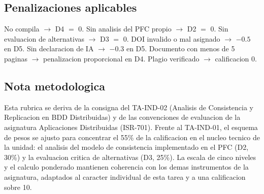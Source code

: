 \documentclass[11pt,a4paper]{article}
\begin{document}
\subsection{Penalizaciones aplicables}
No compila $\rightarrow$ D4 $=$ 0. \quad Sin analisis del PFC propio $\rightarrow$ D2 $=$ 0. \quad Sin evaluacion de alternativas $\rightarrow$ D3 $=$ 0. \quad DOI invalido o mal asignado $\rightarrow$ $-0.5$ en D5. \quad Sin declaracion de IA $\rightarrow$ $-0.3$ en D5. \quad Documento con menos de 5 paginas $\rightarrow$ penalizacion proporcional en D4. \quad Plagio verificado $\rightarrow$ calificacion 0.

\subsection{Nota metodologica}
Esta rubrica se deriva de la consigna del TA-IND-02 (Analisis de Consistencia y Replicacion en BDD Distribuidas) y de las convenciones de evaluacion de la asignatura Aplicaciones Distribuidas (ISR-701). Frente al TA-IND-01, el esquema de pesos se ajusto para concentrar el 55\% de la calificacion en el nucleo tecnico de la unidad: el analisis del modelo de consistencia implementado en el PFC (D2, 30\%) y la evaluacion critica de alternativas (D3, 25\%). La escala de cinco niveles y el calculo ponderado mantienen coherencia con los demas instrumentos de la asignatura, adaptados al caracter individual de esta tarea y a una calificacion sobre 10.

\printbibliography[title={Referencias}]
\end{document}
